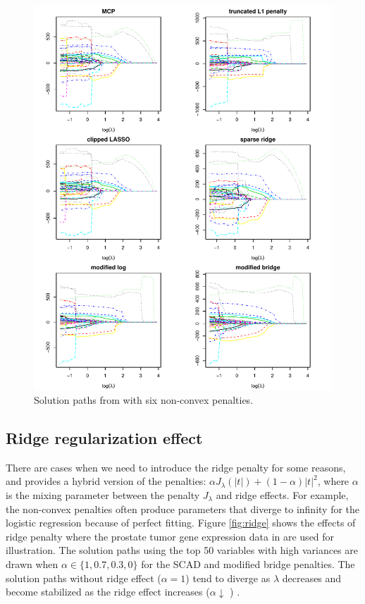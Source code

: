 \begin{figure}[htbp]
  \centering
  \includegraphics[width=\linewidth]{diabetes-others}
  \caption{Solution paths from  with six non-convex penalties.}
  \label{fig:other}
\end{figure}

\subsection{Ridge regularization effect}
There are cases when we need to introduce the ridge penalty for some reasons,
and  provides a hybrid version of the penalties: $\alpha J_{\lambda}(|t|)+(1-\alpha)|t|^2$,
where $\alpha$ is the mixing parameter between the penalty $J_{\lambda}$ and ridge effects.
For example, the non-convex penalties often produce parameters
that diverge to infinity for the logistic regression because of perfect fitting.
Figure \ref{fig:ridge} shows the effects of ridge penalty
where the prostate tumor gene expression data in  are used for illustration.
The solution paths using the top 50 variables with high variances are drawn when $\alpha\in\{1,0.7,0.3,0\}$ for the SCAD and modified bridge penalties.
The solution paths without ridge effect ($\alpha=1$) tend to diverge as $\lambda$ decreases and become stabilized as the ridge effect increases ($\alpha\downarrow$ ) \citep{lee2015strong}.

